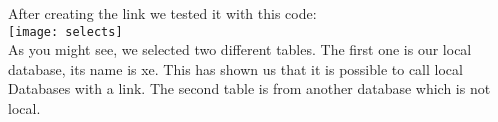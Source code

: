 \documentclass[11pt,a4paper]{article}
\begin{document}
After creating the link we tested it with this code:\\


\texttt{[image: selects]}\\

As you might see, we selected two different tables. The first one is our local database, its name is xe. This has shown us that it is possible to call local Databases with a link.
The second table is from another database which is not local.
\newpage
\end{document}
